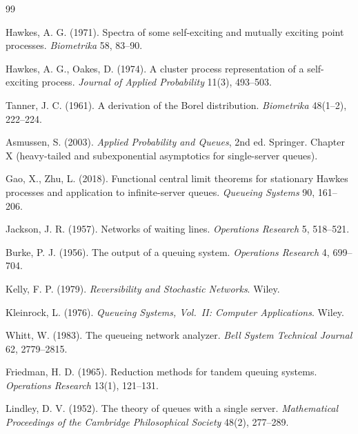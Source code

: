 \documentclass[11pt]{article}
\begin{document}

\begin{thebibliography}{99}
\label{sec:refs}

Hawkes, A. G. (1971). Spectra of some self-exciting and mutually exciting point processes.
\textit{Biometrika} 58, 83--90.

Hawkes, A. G., Oakes, D. (1974). A cluster process representation of a self-exciting
process. \textit{Journal of Applied Probability} 11(3), 493--503.

Tanner, J. C. (1961). A derivation of the Borel distribution. \textit{Biometrika}
48(1--2), 222--224.

Asmussen, S. (2003). \textit{Applied Probability and Queues}, 2nd ed. Springer. Chapter X
(heavy-tailed and subexponential asymptotics for single-server queues).

Gao, X., Zhu, L. (2018). Functional central limit theorems for stationary Hawkes processes
and application to infinite-server queues. \textit{Queueing Systems} 90, 161--206.

Jackson, J. R. (1957). Networks of waiting lines. \textit{Operations Research} 5,
518--521.

Burke, P. J. (1956). The output of a queuing system. \textit{Operations Research} 4,
699--704.

Kelly, F. P. (1979). \textit{Reversibility and Stochastic Networks}. Wiley.

Kleinrock, L. (1976). \textit{Queueing Systems, Vol.\ II: Computer Applications}. Wiley.

Whitt, W. (1983). The queueing network analyzer. \textit{Bell System Technical Journal}
62, 2779--2815.

Friedman, H. D. (1965). Reduction methods for tandem queuing systems. \textit{Operations
Research} 13(1), 121--131.

Lindley, D. V. (1952). The theory of queues with a single server. \textit{Mathematical
Proceedings of the Cambridge Philosophical Society} 48(2), 277--289.


\end{thebibliography}
\end{document}
